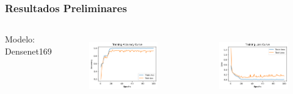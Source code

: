 \documentclass[aspectratio=169]{beamer}
\begin{document}
\begin{frame}
    \frametitle{Resultados Preliminares}

    \centering


    \begin{columns}



        \centering
        \tiny Modelo: Densenet169
        \begin{figure}
            \centering
            \includegraphics[scale=0.5]{img/Notebook_57_1.png}
            \label{fig:enter-label}
        \end{figure}
        \centering



        \centering
        \begin{figure}
            \centering
            \includegraphics[scale=0.5]{img/Notebook_57_0.png}
            \label{fig:enter-label}
        \end{figure}



    \end{columns}
\end{frame}
\end{document}
